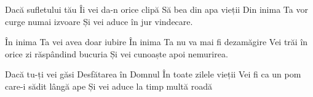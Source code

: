 
\beginverse
Dacă sufletului tău
Îi vei da-n orice clipă
Să bea din apa vieții
Din inima Ta vor curge numai izvoare
Și vei aduce în jur vindecare.
\endverse

\beginchorus
În inima Ta vei avea doar iubire
În inima Ta nu va mai fi dezamăgire
Vei trăi în orice zi răspândind bucuria
Și vei cunoaște apoi nemurirea.
\endchorus

\beginverse
Dacă tu-ți vei găsi
Desfătarea în Domnul
În toate zilele vieții
Vei fi ca un pom care-i sădit lângă ape
Și vei aduce la timp multă roadă
\endverse

\endsong
